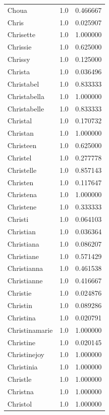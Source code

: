 \documentclass[
  letterpaper,
  DIV=11,
  numbers=noendperiod]{scrreprt}
\begin{document}
\begin{tabular}{lrr}
Choua           &   1.0 &   0.466667 \\
Chris           &   1.0 &   0.025907 \\
Chrisette       &   1.0 &   1.000000 \\
Chrissie        &   1.0 &   0.625000 \\
Chrissy         &   1.0 &   0.125000 \\
Christa         &   1.0 &   0.036496 \\
Christabel      &   1.0 &   0.833333 \\
Christabella    &   1.0 &   1.000000 \\
Christabelle    &   1.0 &   0.833333 \\
Christal        &   1.0 &   0.170732 \\
Christan        &   1.0 &   1.000000 \\
Christeen       &   1.0 &   0.625000 \\
Christel        &   1.0 &   0.277778 \\
Christelle      &   1.0 &   0.857143 \\
Christen        &   1.0 &   0.117647 \\
Christena       &   1.0 &   1.000000 \\
Christene       &   1.0 &   0.333333 \\
Christi         &   1.0 &   0.064103 \\
Christian       &   1.0 &   0.036364 \\
Christiana      &   1.0 &   0.086207 \\
Christiane      &   1.0 &   0.571429 \\
Christianna     &   1.0 &   0.461538 \\
Christianne     &   1.0 &   0.416667 \\
Christie        &   1.0 &   0.024876 \\
Christin        &   1.0 &   0.089286 \\
Christina       &   1.0 &   0.020791 \\
Christinamarie  &   1.0 &   1.000000 \\
Christine       &   1.0 &   0.020145 \\
Christinejoy    &   1.0 &   1.000000 \\
Christinia      &   1.0 &   1.000000 \\
Christle        &   1.0 &   1.000000 \\
Christna        &   1.0 &   1.000000 \\
Christol        &   1.0 &   1.000000 \\

\end{tabular}
\end{document}
